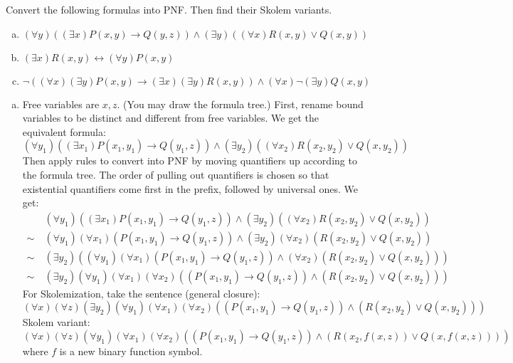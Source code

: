 \begin{problem} 
    
    Convert the following formulas into PNF. Then find their Skolem variants.
    \begin{enumerate}[(a)]
        \item $(\forall y)((\exists x)P(x,y)\to Q(y,z))\wedge (\exists y)((\forall x)R(x,y)\vee Q(x,y))$
        \item $(\exists x)R(x,y)\leftrightarrow (\forall y)P(x,y)$
        \item $\neg((\forall x)(\exists y)P(x,y)\to (\exists x)(\exists y)R(x,y))\wedge(\forall x)\neg(\exists y)Q(x,y)$
    \end{enumerate}

    \begin{solution}

        \begin{enumerate}[(a)]
            \item Free variables are $x,z$. (You may draw the formula tree.) First, rename bound variables to be distinct and different from free variables. We get the equivalent formula:
            $$
            (\forall y_1)((\exists x_1)P(x_1,y_1)\to Q(y_1,z))\wedge (\exists y_2)((\forall x_2)R(x_2,y_2)\vee Q(x,y_2))
            $$
            Then apply rules to convert into PNF by moving quantifiers up according to the formula tree. The order of pulling out quantifiers is chosen so that existential quantifiers come first in the prefix, followed by universal ones. We get:
            \begin{align*}
                &(\forall y_1)((\exists x_1)P(x_1,y_1)\to Q(y_1,z))\wedge (\exists y_2)((\forall x_2)R(x_2,y_2)\vee Q(x,y_2))\\
                \sim\ & (\forall y_1)(\forall x_1)(P(x_1,y_1)\to Q(y_1,z))\wedge (\exists y_2)(\forall x_2)(R(x_2,y_2)\vee Q(x,y_2))\\
                \sim\ & (\exists y_2)((\forall y_1)(\forall x_1)(P(x_1,y_1)\to Q(y_1,z))\wedge (\forall x_2)(R(x_2,y_2)\vee Q(x,y_2)))\\
                \sim\ & (\exists y_2)(\forall y_1)(\forall x_1)(\forall x_2)((P(x_1,y_1)\to Q(y_1,z))\wedge (R(x_2,y_2)\vee Q(x,y_2)))
            \end{align*}
            For Skolemization, take the sentence (general closure):
            $$
            (\forall x)(\forall z)(\exists y_2)(\forall y_1)(\forall x_1)(\forall x_2)((P(x_1,y_1)\to Q(y_1,z))\wedge (R(x_2,y_2)\vee Q(x,y_2)))
            $$
            Skolem variant:
            $$
            (\forall x)(\forall z)(\forall y_1)(\forall x_1)(\forall x_2)((P(x_1,y_1)\to Q(y_1,z))\wedge (R(x_2,f(x,z))\vee Q(x,f(x,z))))
            $$
            where $f$ is a new binary function symbol.
            

\end{enumerate}
\end{solution}
\end{problem}
